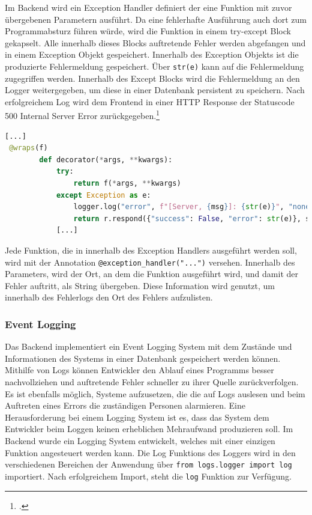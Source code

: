 Im Backend wird ein Exception Handler definiert der eine Funktion mit zuvor übergebenen Parametern ausführt. Da eine fehlerhafte Ausführung auch dort zum Programmabsturz führen würde, wird die Funktion in einem try-except Block gekapselt. Alle innerhalb dieses Blocks auftretende Fehler werden abgefangen und in einem Exception Objekt gespeichert. Innerhalb des Exception Objekts ist die produzierte Fehlermeldung gespeichert. Über \texttt{str(e)} kann auf die Fehlermeldung zugegriffen werden. Innerhalb des Except Blocks wird die Fehlermeldung an den Logger weitergegeben, um diese in einer Datenbank persistent zu speichern. Nach erfolgreichem Log wird dem Frontend in einer HTTP Response der Statuscode 500 \glqq Internal Server Error\grqq{} zurückgegeben.\footcite{fielding1999rfc2616}

\begin{lstlisting}[language=Python]
[...]
 @wraps(f)
        def decorator(*args, **kwargs):
            try:
                return f(*args, **kwargs)
            except Exception as e:
                logger.log("error", f"[Server, {msg}]: {str(e)}", "none")
                return r.respond({"success": False, "error": str(e)}, status=500)
            [...]
\end{lstlisting}

Jede Funktion, die in innerhalb des Exception Handlers ausgeführt werden soll, wird mit der Annotation \texttt{@exception\_{}handler("...")} versehen. Innerhalb des Parameters, wird der Ort, an dem die Funktion ausgeführt wird, und damit der Fehler auftritt, als String übergeben. Diese Information wird genutzt, um innerhalb des Fehlerlogs den Ort des Fehlers aufzulisten.

\subsubsection{Event Logging}
Das Backend implementiert ein Event Logging System mit dem Zustände und Informationen des Systems in einer Datenbank gespeichert werden können. Mithilfe von Logs können Entwickler den Ablauf eines Programms besser nachvollziehen und auftretende Fehler schneller zu ihrer Quelle zurückverfolgen. Es ist ebenfalls möglich, Systeme aufzusetzen, die die auf Logs auslesen und beim Auftreten eines Errors die zuständigen Personen alarmieren. Eine Herausforderung bei einem Logging System ist es, dass das System dem Entwickler beim Loggen keinen erheblichen Mehraufwand produzieren soll. Im Backend wurde ein Logging System entwickelt, welches mit einer einzigen Funktion angesteuert werden kann. Die Log Funktions des Loggers wird in den verschiedenen Bereichen der Anwendung über \texttt{from logs.logger import log} importiert. Nach erfolgreichem Import, steht die \texttt{log} Funktion zur Verfügung. 

